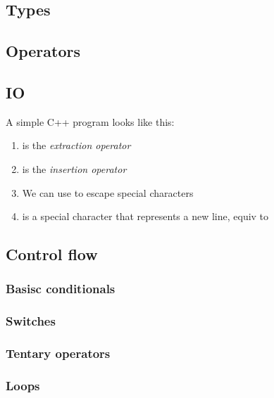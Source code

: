 \documentclass{article}
\begin{document}
\subsection{Types}


\subsection{Operators}


\subsection{IO}
A simple C++ program looks like this:

\begin{enumerate}
    \item {} is the \emph{extraction operator}
    \item {} is the \emph{insertion operator}
    \item We can use  to escape special characters
    \item {} is a special character that represents a new line, equiv to 
\end{enumerate}

\subsection{Control flow}
\subsubsection{Basisc conditionals}

\subsubsection{Switches}

\subsubsection{Tentary operators}

\subsubsection{Loops}

\end{document}
